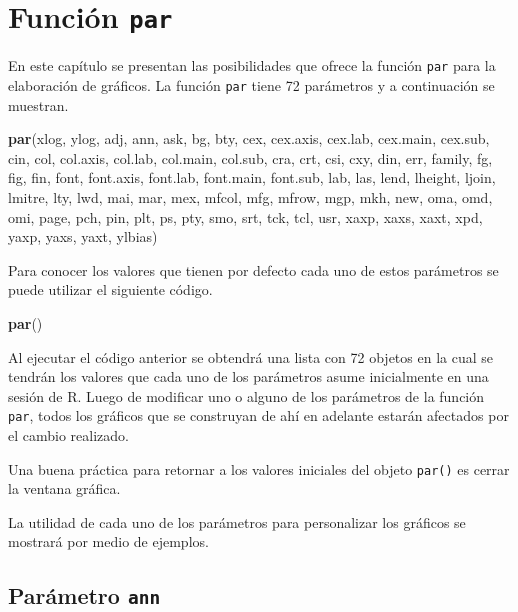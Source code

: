 \documentclass[10pt,]{krantz}
\makeatletter
\newenvironment{Shaded}{\begin{snugshade}}{\end{snugshade}}
\newcommand{\KeywordTok}[1]{\textcolor[rgb]{0.13,0.29,0.53}{\textbf{#1}}}
\newcommand{\NormalTok}[1]{#1}
\let\proglang=\textsf
\newenvironment{kframe}{%
\medskip{}
\setlength{\fboxsep}{.8em}
 \def\at@end@of@kframe{}%
 \ifinner\ifhmode%
  \def\at@end@of@kframe{\end{minipage}}%
  \begin{minipage}{\columnwidth}%
 \fi\fi%
 \def\FrameCommand##1{\hskip\@totalleftmargin \hskip-\fboxsep
 \colorbox{shadecolor}{##1}\hskip-\fboxsep
     \hskip-\linewidth \hskip-\@totalleftmargin \hskip\columnwidth}%
 \MakeFramed {\advance\hsize-\width
   \@totalleftmargin\z@ \linewidth\hsize
   \@setminipage}}%
 {\par\unskip\endMakeFramed%
 \at@end@of@kframe}
\renewenvironment{Shaded}{\begin{kframe}}{\end{kframe}}
\let\BeginKnitrBlock\begin \let\EndKnitrBlock\end
\makeatother
\begin{document}
\chapter{\texorpdfstring{Función
\texttt{par}}{Función par}}\label{funcion-par}

En este capítulo se presentan las posibilidades que ofrece la función
\texttt{par} para la elaboración de gráficos. La función \texttt{par}
tiene 72 parámetros y a continuación se muestran.

\begin{Shaded}
\begin{Highlighting}[]
\KeywordTok{par}\NormalTok{(xlog, ylog, adj, ann, ask, bg, bty, cex, cex.axis, cex.lab,}
\NormalTok{    cex.main, cex.sub, cin, col, col.axis, col.lab, col.main,}
\NormalTok{    col.sub, cra, crt, csi, cxy, din, err, family, fg, fig, fin,}
\NormalTok{    font, font.axis, font.lab, font.main, font.sub, lab, las, }
\NormalTok{    lend, lheight, ljoin, lmitre, lty, lwd, mai, mar, mex, mfcol,}
\NormalTok{    mfg, mfrow, mgp, mkh, new, oma, omd, omi, page, pch, pin, }
\NormalTok{    plt, ps, pty, smo, srt, tck, tcl, usr, xaxp, xaxs, xaxt, xpd, }
\NormalTok{    yaxp, yaxs, yaxt, ylbias)}
\end{Highlighting}
\end{Shaded}

Para conocer los valores que tienen por defecto cada uno de estos
parámetros se puede utilizar el siguiente código.

\begin{Shaded}
\begin{Highlighting}[]
\KeywordTok{par}\NormalTok{()}
\end{Highlighting}
\end{Shaded}

Al ejecutar el código anterior se obtendrá una lista con 72 objetos en
la cual se tendrán los valores que cada uno de los parámetros asume
inicialmente en una sesión de \proglang{R}. Luego de modificar uno o
alguno de los parámetros de la función \texttt{par}, todos los gráficos
que se construyan de ahí en adelante estarán afectados por el cambio
realizado.

\BeginKnitrBlock{rmdnote}
Una buena práctica para retornar a los valores iniciales del objeto
\texttt{par()} es cerrar la ventana gráfica.
\EndKnitrBlock{rmdnote}

La utilidad de cada uno de los parámetros para personalizar los gráficos
se mostrará por medio de ejemplos.

\section{\texorpdfstring{Parámetro \texttt{ann}
}{Parámetro ann  }}\label{parametro-ann}
\end{document}
